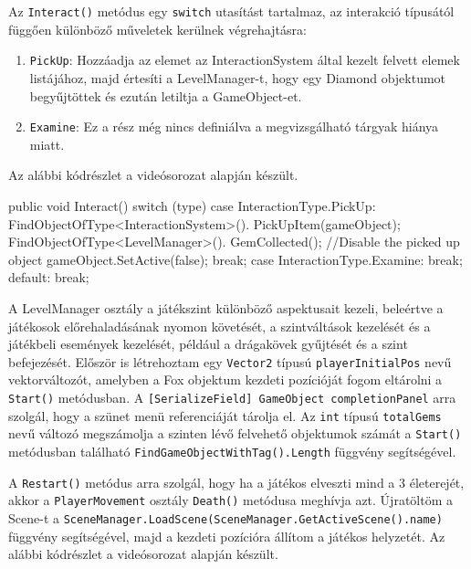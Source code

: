Az \texttt{Interact()} metódus egy \texttt{switch} utasítást tartalmaz, az interakció típusától függően különböző műveletek kerülnek végrehajtásra:
\begin{enumerate}
\item \texttt{PickUp}: Hozzáadja az elemet az InteractionSystem által kezelt felvett elemek listájához, majd értesíti a LevelManager-t, hogy egy Diamond objektumot begyűjtöttek és ezután letiltja a GameObject-et.
\item \texttt{Examine}: Ez a rész még nincs definiálva a megvizsgálható tárgyak hiánya miatt.
\end{enumerate}

\newpage
Az alábbi kódrészlet a \cite{youtubeplaylist} videósorozat alapján készült.
\begin{java}
public void Interact()
{
    switch (type)
    {
        case InteractionType.PickUp:
            FindObjectOfType<InteractionSystem>().
                PickUpItem(gameObject);
            FindObjectOfType<LevelManager>().
                GemCollected();
            //Disable the picked up object
            gameObject.SetActive(false);
            break;
        case InteractionType.Examine:
            break;
        default:
            break;
    }
}
\end{java}


A LevelManager osztály a játékszint különböző aspektusait kezeli, beleértve a játékosok előrehaladásának nyomon követését, a szintváltások kezelését és a játékbeli események kezelését, például a drágakövek gyűjtését és a szint befejezését. Először is létrehoztam egy \texttt{Vector2} típusú \texttt{playerInitialPos} nevű vektorváltozót, amelyben a Fox objektum kezdeti pozícióját fogom eltárolni a \texttt{Start()} metódusban. A \texttt{[SerializeField] GameObject completionPanel} arra szolgál, hogy a szünet menü referenciáját tárolja el. Az \texttt{int} típusú \texttt{totalGems} nevű változó megszámolja a szinten lévő felvehető objektumok számát a \texttt{Start()} metódusban található \texttt{FindGameObjectWithTag().Length} függvény segítségével.

A \texttt{Restart()} metódus arra szolgál, hogy ha a játékos elveszti mind a 3 életerejét, akkor a \texttt{PlayerMovement} osztály \texttt{Death()} metódusa meghívja azt. 
Újratöltöm a Scene-t a \texttt{SceneManager.LoadScene(SceneManager.GetActiveScene().name)} függvény segítségével, majd a kezdeti pozícióra állítom a játékos helyzetét. Az alábbi kódrészlet a \cite{youtubeplaylist} videósorozat alapján készült.

